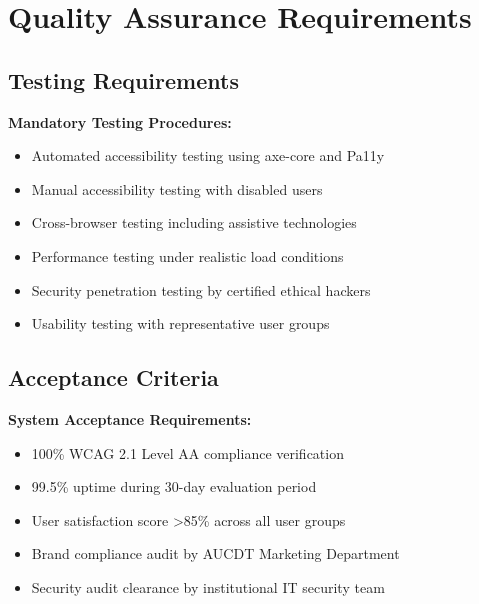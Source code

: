 \documentclass[11pt, a4paper]{article}
\begin{document}
\section{Quality Assurance Requirements}
\label{sec:quality_assurance}

\subsection{Testing Requirements}
\label{sec:testing_requirements}

\begin{criticalbox}
\textbf{Mandatory Testing Procedures:}
\begin{itemize}
    \item Automated accessibility testing using axe-core and Pa11y
    \item Manual accessibility testing with disabled users
    \item Cross-browser testing including assistive technologies
    \item Performance testing under realistic load conditions
    \item Security penetration testing by certified ethical hackers
    \item Usability testing with representative user groups
\end{itemize}
\end{criticalbox}

\subsection{Acceptance Criteria}
\label{sec:acceptance_criteria}

\textbf{System Acceptance Requirements:}
\begin{itemize}
    \item 100\% WCAG 2.1 Level AA compliance verification
    \item 99.5\% uptime during 30-day evaluation period
    \item User satisfaction score >85\% across all user groups
    \item Brand compliance audit by AUCDT Marketing Department
    \item Security audit clearance by institutional IT security team
\end{itemize}

\end{document}
